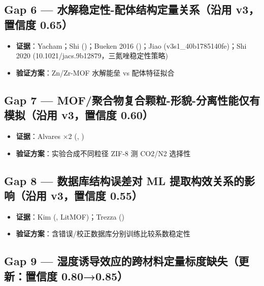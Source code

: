 \documentclass[12pt,a4paper]{ctexart}
\providecommand{\tightlist}{%
  \setlength{\itemsep}{0pt}\setlength{\parskip}{0pt}}
\begin{document}
\subsection{Gap 6 --- 水解稳定性-配体结构定量关系（沿用 v3，置信度 0.65）}\label{gap:gap-6-ux6c34ux89e3ux7a33ux5b9aux6027-ux914dux4f53ux7ed3ux6784ux5b9aux91cfux5173ux7cfbux6cbfux7528-v3ux7f6eux4fe1ux5ea6-0.65}

\begin{itemize}
\tightlist
\item
  \textbf{证据}：Yacham；Shi (\cite{p11})；Bueken 2016 (\cite{p34})；Jiao (v3s1\_40b1785140fe)；Shi 2020 (10.1021/jacs.9b12879，三氮唑稳定性策略)
\item
  \textbf{验证方案}：Zn/Zr-MOF 水解能垒 vs 配体特征拟合
\end{itemize}

\subsection{Gap 7 --- MOF/聚合物复合颗粒-形貌-分离性能仅有模拟（沿用 v3，置信度 0.60）}\label{gap:gap-7-mofux805aux5408ux7269ux590dux5408ux9897ux7c92-ux5f62ux8c8c-ux5206ux79bbux6027ux80fdux4ec5ux6709ux6a21ux62dfux6cbfux7528-v3ux7f6eux4fe1ux5ea6-0.60}

\begin{itemize}
\tightlist
\item
  \textbf{证据}：Alvares ×2 (\cite{p22}, \cite{p25})
\item
  \textbf{验证方案}：实验合成不同粒径 ZIF-8 测 CO2/N2 选择性
\end{itemize}

\subsection{Gap 8 --- 数据库结构误差对 ML 提取构效关系的影响（沿用 v3，置信度 0.55）}\label{gap:gap-8-ux6570ux636eux5e93ux7ed3ux6784ux8befux5deeux5bf9-ml-ux63d0ux53d6ux6784ux6548ux5173ux7cfbux7684ux5f71ux54cdux6cbfux7528-v3ux7f6eux4fe1ux5ea6-0.55}

\begin{itemize}
\tightlist
\item
  \textbf{证据}：Kim (\cite{p31}, LitMOF)；Trezza (\cite{p33})
\item
  \textbf{验证方案}：含错误/校正数据库分别训练比较系数稳定性
\end{itemize}

\subsection{Gap 9 --- 湿度诱导效应的跨材料定量标度缺失（更新：置信度 0.80→0.85）}\label{gap:gap-9-ux6e7fux5ea6ux8bf1ux5bfcux6548ux5e94ux7684ux8de8ux6750ux6599ux5b9aux91cfux6807ux5ea6ux7f3aux5931ux66f4ux65b0ux7f6eux4fe1ux5ea6-0.800.85}
\end{document}
